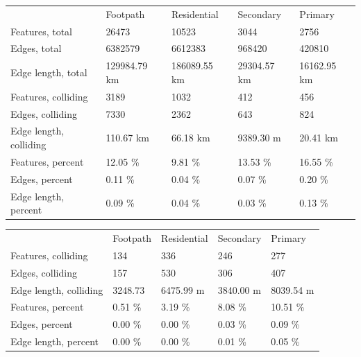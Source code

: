 \documentclass[a4paper]{article}
\begin{document}
\begin{table}[H]
    \begin{tabular}{lllll}
                                & Footpath      & Residential  & Secondary   & Primary     \\
        Features, total         & 26473         & 10523        & 3044        & 2756        \\
        Edges, total            & 6382579       & 6612383      & 968420      & 420810      \\
        Edge length, total      & 129984.79 km  & 186089.55 km & 29304.57 km & 16162.95 km \\
        Features, colliding     & 3189          & 1032         & 412         & 456         \\
        Edges, colliding        & 7330          & 2362         & 643         & 824         \\
        Edge length, colliding  & 110.67 km     & 66.18 km     & 9389.30 m   & 20.41 km    \\
        Features, percent       & 12.05 \%      & 9.81 \%      & 13.53 \%    & 16.55 \%    \\
        Edges, percent          & 0.11 \%       & 0.04 \%      & 0.07 \%     & 0.20 \%     \\
        Edge length, percent    & 0.09 \%       & 0.04 \%      & 0.03 \%     & 0.13 \%

    \end{tabular}
    \label{table:road-collision}
\end{table}

\begin{table}[H]
    \begin{tabular}{lllll}
                                & Footpath      & Residential  & Secondary   & Primary     \\
        Features, colliding     & 134           & 336          & 246         & 277         \\
        Edges, colliding        & 157           & 530          & 306         & 407         \\
        Edge length, colliding  & 3248.73       & 6475.99 m    & 3840.00 m   & 8039.54 m   \\
        Features, percent       & 0.51 \%       & 3.19 \%      & 8.08 \%     & 10.51 \%    \\
        Edges, percent          & 0.00 \%       & 0.00 \%      & 0.03 \%     & 0.09 \%     \\
        Edge length, percent    & 0.00 \%       & 0.00 \%      & 0.01 \%     & 0.05 \%

    \end{tabular}
    \label{table:road-collision-corrected}
\end{table}
\end{document}
